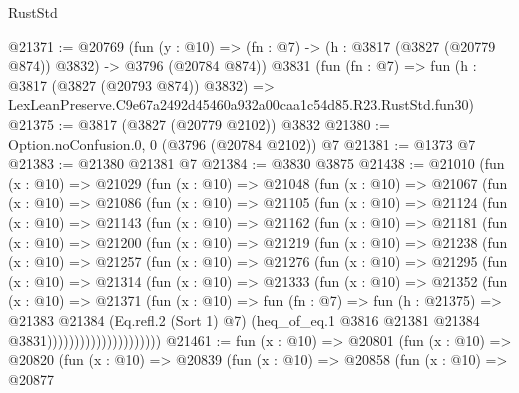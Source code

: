 \begin{lexlean}{RustStd}
\begin{coremodule}
@21371 := @20769
    (fun (y : @10) => (fn : @7) -> (h : @3817 (@3827 (@20779 @874)) @3832) -> @3796 (@20784 @874))
    @3831
    (fun (fn : @7) =>
    fun (h : @3817 (@3827 (@20793 @874)) @3832) =>
    LexLeanPreserve.C9e67a2492d45460a932a00caa1c54d85.R23.RustStd.fun30)
@21375 := @3817 (@3827 (@20779 @2102)) @3832
@21380 := Option.noConfusion.{0, 0} (@3796 (@20784 @2102)) @7
@21381 := @1373 @7
@21383 := @21380 @21381 @7
@21384 := @3830 @3875
@21438 := @21010
    (fun (x : @10) =>
    @21029
      (fun (x : @10) =>
      @21048
        (fun (x : @10) =>
        @21067
          (fun (x : @10) =>
          @21086
            (fun (x : @10) =>
            @21105
              (fun (x : @10) =>
              @21124
                (fun (x : @10) =>
                @21143
                  (fun (x : @10) =>
                  @21162
                    (fun (x : @10) =>
                    @21181
                      (fun (x : @10) =>
                      @21200
                        (fun (x : @10) =>
                        @21219
                          (fun (x : @10) =>
                          @21238
                            (fun (x : @10) =>
                            @21257
                              (fun (x : @10) =>
                              @21276
                                (fun (x : @10) =>
                                @21295
                                  (fun (x : @10) =>
                                  @21314
                                    (fun (x : @10) =>
                                    @21333
                                      (fun (x : @10) =>
                                      @21352
                                        (fun (x : @10) =>
                                        @21371
                                          (fun (x : @10) =>
                                          fun (fn : @7) =>
                                          fun (h : @21375) =>
                                          @21383
                                            @21384
                                            (Eq.refl.{2} (Sort 1) @7)
                                            (heq_of_eq.{1}
                                              @3816
                                              @21381
                                              @21384
                                              @3831)))))))))))))))))))))
@21461 := fun (x : @10) =>
  @20801
    (fun (x : @10) =>
    @20820
      (fun (x : @10) =>
      @20839
        (fun (x : @10) =>
        @20858
          (fun (x : @10) =>
          @20877

\end{coremodule}
\end{lexlean}
